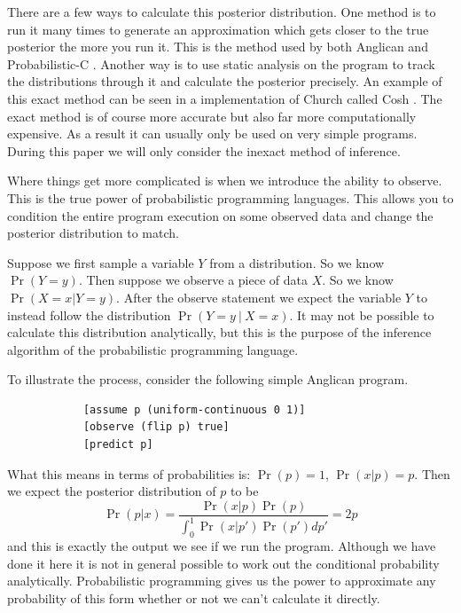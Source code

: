 \documentclass[a4paper]{article}
\begin{document}
There are a few ways to calculate this posterior distribution. One method is to run it many times to generate an approximation which gets closer to the true posterior the more you run it. This is the method used by both Anglican and Probabilistic-C \cite{Anglican, ProbabilisticC}. Another way is to use static analysis on the program to track the distributions through it and calculate the posterior precisely. An example of this exact method can be seen in a implementation of Church called Cosh \cite{Cosh}. The exact method is of course more accurate but also far more computationally expensive. As a result it can usually only be used on very simple programs. During this paper we will only consider the inexact method of inference.

Where things get more complicated is when we introduce the ability to observe. This is the true power of probabilistic programming languages. This allows you to condition the entire program execution on some observed data and change the posterior distribution to match.

Suppose we first sample a variable \(Y\) from a distribution. So we know \(\Pr(Y = y)\). Then suppose we observe a piece of data \(X\). So we know \(\Pr(X = x | Y = y)\). After the observe statement we expect the variable \(Y\) to instead follow the distribution \(\Pr(Y = y\ |\ X = x)\). It may not be possible to calculate this distribution analytically, but this is the purpose of the inference algorithm of the probabilistic programming language.

To illustrate the process, consider the following simple Anglican program.

\begin{center}
	\begin{varwidth}{\linewidth}
		\small
		\begin{verbatim}
			[assume p (uniform-continuous 0 1)]
			[observe (flip p) true]
			[predict p]
		\end{verbatim}
	\end{varwidth}
\end{center}
What this means in terms of probabilities is: \(\Pr(p) = 1\), \(\Pr(x | p) = p\). Then we expect the posterior distribution of \(p\) to be
\[\Pr(p | x) = \frac{\Pr(x | p) \Pr(p)}{\int_0^1 \Pr(x | p') \Pr(p') dp'} = 2p\]
and this is exactly the output we see if we run the program. Although we have done it here it is not in general possible to work out the conditional probability analytically. Probabilistic programming gives us the power to approximate any probability of this form whether or not we can't calculate it directly.
\end{document}
